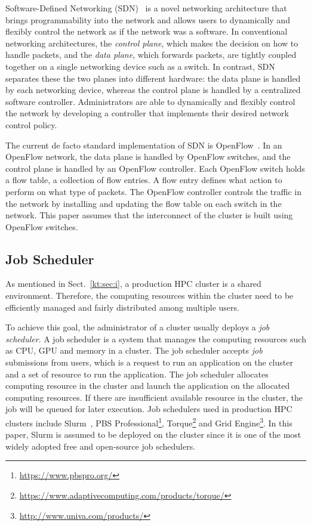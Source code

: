\documentclass[graybox]{svmult}
\begin{document}
Software-Defined Networking (SDN)~\cite{Jamalian2015} is a novel networking
architecture that brings programmability into the network and allows users to
dynamically and flexibly control the network as if the network was a software.
In conventional networking architectures, the \textit{control plane}, which
makes the decision on how to handle packets, and the \textit {data plane},
which forwards packets, are tightly coupled together on a single networking
device such as a switch. In contrast, SDN separates these the two planes into
different hardware: the data plane is handled by each networking device,
whereas the control plane is handled by a centralized software controller.
Administrators are able to dynamically and flexibly control the network by
developing a controller that implements their desired network control policy.

The current de facto standard implementation of SDN is
OpenFlow~\cite{McKeown2008}. In an OpenFlow network, the data plane is handled
by OpenFlow switches, and the control plane is handled by an OpenFlow
controller. Each OpenFlow switch holds a flow table, a collection of flow
entries. A flow entry defines what action to perform on what type of packets.
The OpenFlow controller controls the traffic in the network by installing and
updating the flow table on each switch in the network. This paper assumes that
the interconnect of the cluster is built using OpenFlow switches.

\subsection{Job Scheduler}\label{kt:sec:ii-jms}

As mentioned in Sect.~\ref{kt:sec:i}, a production HPC cluster is a shared
environment. Therefore, the computing resources within the cluster need to be
efficiently managed and fairly distributed among multiple users.

To achieve this goal, the administrator of a cluster usually deploys a
\textit{job scheduler}. A job scheduler is a system that manages the computing
resources such as CPU, GPU and memory in a cluster. The job scheduler accepts
\textit{job} submissions from users, which is a request to run an application
on the cluster and a set of resource to run the application. The job scheduler
allocates computing resource in the cluster and launch the application on the
allocated computing resources. If there are insufficient available resource in
the cluster, the job will be queued for later execution. Job schedulers used
in production HPC clusters include Slurm~\cite{Yoo2003}, PBS
Professional\footnote{\url{https://www.pbspro.org/}},
Torque\footnote{\url{https://www.adaptivecomputing.com/products/torque/}} and
Grid Engine\footnote{\url{http://www.univa.com/products/}}. In this paper,
Slurm is assumed to be deployed on the cluster since it is one of the most
widely adopted free and open-source job schedulers.
\end{document}
